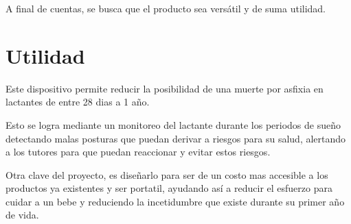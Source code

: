 A final de cuentas, se busca que el producto sea versátil y de suma utilidad.

\section{Utilidad}
Este dispositivo permite reducir la posibilidad de una muerte por asfixia en lactantes de entre 28 dias a 1 año.

Esto se logra mediante un monitoreo del lactante durante los periodos de sueño detectando malas posturas que puedan derivar a riesgos para su salud, alertando a los tutores para que puedan reaccionar y evitar estos riesgos.

Otra clave del proyecto, es diseñarlo para ser de un costo mas accesible a los productos ya existentes y ser portatil, ayudando así a reducir el esfuerzo para cuidar a un bebe y reduciendo la incetidumbre que existe durante su primer año de vida.
